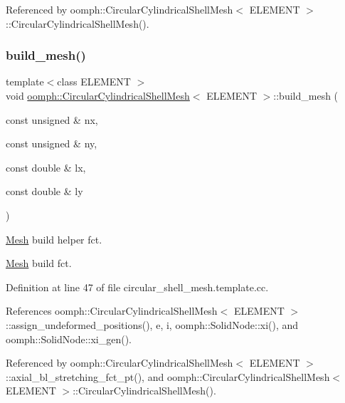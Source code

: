 Referenced by oomph\+::\+Circular\+Cylindrical\+Shell\+Mesh$<$ E\+L\+E\+M\+E\+N\+T $>$\+::\+Circular\+Cylindrical\+Shell\+Mesh().

\mbox{\label{classoomph_1_1CircularCylindricalShellMesh_a032ddb9b1afa4ef446ca74c8a6965000}} 
\subsubsection{\texorpdfstring{build\+\_\+mesh()}{build\_mesh()}}
{\footnotesize\ttfamily template$<$class E\+L\+E\+M\+E\+NT $>$ \\
void \hyperlink{classoomph_1_1CircularCylindricalShellMesh}{oomph\+::\+Circular\+Cylindrical\+Shell\+Mesh}$<$ E\+L\+E\+M\+E\+NT $>$\+::build\+\_\+mesh (\begin{DoxyParamCaption}\item[{const unsigned \&}]{nx,  }\item[{const unsigned \&}]{ny,  }\item[{const double \&}]{lx,  }\item[{const double \&}]{ly }\end{DoxyParamCaption})\hspace{0.3cm}{\ttfamily [private]}}



\hyperlink{classoomph_1_1Mesh}{Mesh} build helper fct. 

\hyperlink{classoomph_1_1Mesh}{Mesh} build fct. 

Definition at line 47 of file circular\+\_\+shell\+\_\+mesh.\+template.\+cc.



References oomph\+::\+Circular\+Cylindrical\+Shell\+Mesh$<$ E\+L\+E\+M\+E\+N\+T $>$\+::assign\+\_\+undeformed\+\_\+positions(), e, i, oomph\+::\+Solid\+Node\+::xi(), and oomph\+::\+Solid\+Node\+::xi\+\_\+gen().



Referenced by oomph\+::\+Circular\+Cylindrical\+Shell\+Mesh$<$ E\+L\+E\+M\+E\+N\+T $>$\+::axial\+\_\+bl\+\_\+stretching\+\_\+fct\+\_\+pt(), and oomph\+::\+Circular\+Cylindrical\+Shell\+Mesh$<$ E\+L\+E\+M\+E\+N\+T $>$\+::\+Circular\+Cylindrical\+Shell\+Mesh().

